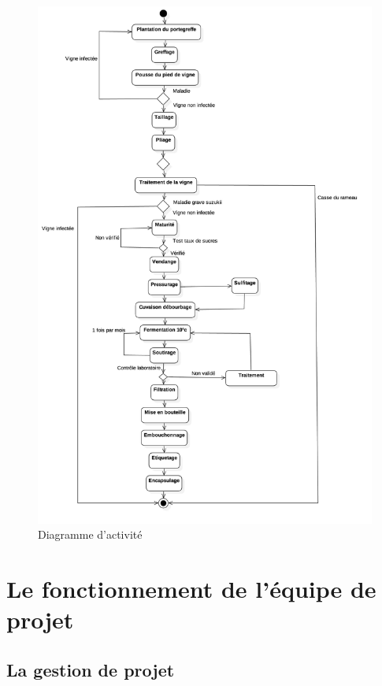 \documentclass[a4paper, titlepage]{report}
\begin{document}
\clearpage
\begin{figure}[!h]
\centering
\includegraphics{Images/DiagrammeActivite.jpg}
\caption{Diagramme d'activité}
\end{figure}

\clearpage
\section{Le fonctionnement de l'équipe de
projet}\label{le-fonctionnement-de-lequipe-de-projet}

\subsection{La gestion de projet}
\end{document}
